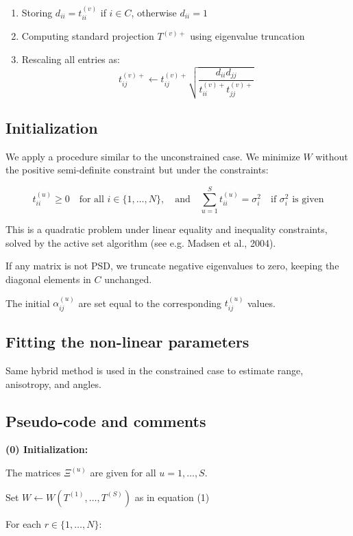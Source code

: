 \documentclass[11pt]{article}
\begin{document}
\begin{enumerate}
  \item Storing $d_{ii} = t_{ii}^{(v)}$ if $i \in C$, otherwise $d_{ii} = 1$
  \item Computing standard projection $T^{(v)+}$ using eigenvalue truncation
  \item Rescaling all entries as:
  \[
  t_{ij}^{(v)+} \leftarrow t_{ij}^{(v)+} \sqrt{ \frac{d_{ii} d_{jj}}{t_{ii}^{(v)+} t_{jj}^{(v)+}} }
  \]
\end{enumerate}

\subsection{Initialization}

We apply a procedure similar to the unconstrained case. We minimize $W$ without the positive semi-definite constraint but under the constraints:

\[
t_{ii}^{(u)} \geq 0 \quad \text{for all } i \in \{1,\ldots,N\}, \quad \text{and} \quad \sum_{u=1}^S t_{ii}^{(u)} = \sigma_i^2 \quad \text{if } \sigma_i^2 \text{ is given}
\]

This is a quadratic problem under linear equality and inequality constraints, solved by the active set algorithm (see e.g. Madsen et al., 2004).

If any matrix is not PSD, we truncate negative eigenvalues to zero, keeping the diagonal elements in $C$ unchanged.

The initial $\alpha_{ij}^{(u)}$ are set equal to the corresponding $t_{ij}^{(u)}$ values.

\subsection{Fitting the non-linear parameters}

Same hybrid method is used in the constrained case to estimate range, anisotropy, and angles.

\subsection{Pseudo-code and comments}

\textbf{(0) Initialization:}

The matrices $\Xi^{(u)}$ are given for all $u = 1, \ldots, S$.

Set $W \leftarrow W(T^{(1)}, \ldots, T^{(S)})$ as in equation (1)

For each $r \in \{1, \ldots, N\}$:
\end{document}
